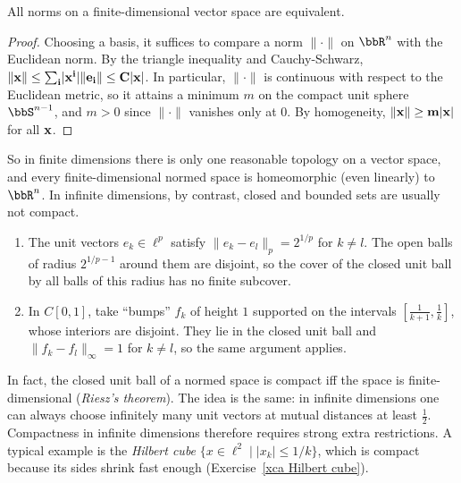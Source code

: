 \begin{cor}\label{cor norms equivalent}
    All norms on a finite-dimensional vector space are equivalent.
\end{cor}
\begin{proof}
    Choosing a basis, it suffices to compare a norm $\lVert\cdot\rVert$ on $\bbR^n$ with the Euclidean norm. By the triangle inequality and Cauchy-Schwarz, $\lVert \bf{x}\rVert\leq\sum_i\lvert x^i\rvert\lVert \bf{e}_i\rVert\leq C\lvert \bf{x}\rvert$. In particular, $\lVert\cdot\rVert$ is continuous with respect to the Euclidean metric, so it attains a minimum $m$ on the compact unit sphere $\bbS^{n-1}$, and $m>0$ since $\lVert\cdot\rVert$ vanishes only at $0$. By homogeneity, $\lVert \bf{x}\rVert\geq m\lvert \bf{x}\rvert$ for all $\bf{x}$.
\end{proof}

So in finite dimensions there is only one reasonable topology on a vector space, and every finite-dimensional normed space is homeomorphic (even linearly) to $\bbR^n$. In infinite dimensions, by contrast, closed and bounded sets are usually not compact.

\begin{example}\label{example noncompact balls}
    \begin{enumerate}
        \item The unit vectors $e_k\in\ell^p$ satisfy $\lVert e_k-e_l\rVert_p=2^{1/p}$ for $k\neq l$. The open balls of radius $2^{1/p-1}$ around them are disjoint, so the cover of the closed unit ball by all balls of this radius has no finite subcover.
        \item In $C[0,1]$, take ``bumps'' $f_k$ of height $1$ supported on the intervals $[\frac{1}{k+1},\frac1k]$, whose interiors are disjoint. They lie in the closed unit ball and $\lVert f_k-f_l\rVert_\infty=1$ for $k\neq l$, so the same argument applies.
    \end{enumerate}
    In fact, the closed unit ball of a normed space is compact iff the space is finite-dimensional (\emph{Riesz's theorem}). The idea is the same: in infinite dimensions one can always choose infinitely many unit vectors at mutual distances at least $\frac12$. Compactness in infinite dimensions therefore requires strong extra restrictions. A typical example is the \emph{Hilbert cube} $\{x\in\ell^2\mid\lvert x_k\rvert\leq1/k\}$, which is compact because its sides shrink fast enough (Exercise~\ref{xca Hilbert cube}).
\end{example}

